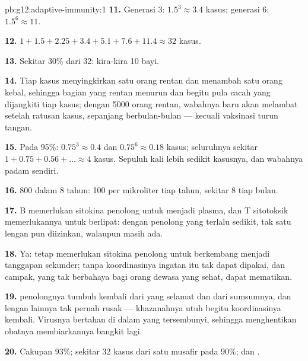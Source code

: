 \begin{solution}{pb:g12:adaptive-immunity:1}
\textbf{11.} Generasi 3: $1.5^3 \approx 3.4$ kasus; generasi 6:
$1.5^6 \approx 11$.

\textbf{12.} $1 + 1.5 + 2.25 + 3.4 + 5.1 + 7.6 + 11.4 \approx 32$ kasus.

\textbf{13.} Sekitar 30\% dari 32: kira-kira 10 bayi.

\textbf{14.} Tiap kasus menyingkirkan satu orang rentan dan menambah
satu orang kebal, sehingga bagian yang rentan menurun dan begitu pula
cacah yang dijangkiti tiap kasus; dengan 5000 orang rentan, wabahnya
baru akan melambat setelah ratusan kasus, sepanjang berbulan-bulan ---
kecuali vaksinasi turun tangan.

\textbf{15.} Pada 95\%: $0.75^3 \approx 0.4$ dan $0.75^6 \approx 0.18$
kasus; seluruhnya sekitar $1 + 0.75 + 0.56 + \dots \approx 4$ kasus.
Sepuluh kali lebih sedikit kasusnya, dan wabahnya padam sendiri.

\textbf{16.} 800 dalam 8 tahun: 100 per mikroliter tiap tahun, sekitar
8 tiap bulan.

\textbf{17.}  B memerlukan sitokina  penolong untuk menjadi 
plasma, dan  T sitotoksik memerlukannya untuk berlipat: dengan 
penolong yang terlalu sedikit, tak satu lengan pun diizinkan, walaupun
 masih ada.

\textbf{18.} Ya:  tetap memerlukan sitokina penolong untuk
berkembang menjadi tanggapan sekunder; tanpa koordinasinya ingatan itu
tak dapat dipakai, dan campak, yang tak berbahaya bagi orang dewasa
yang sehat, dapat mematikan.

\textbf{19.}   penolongnya tumbuh kembali dari  yang
selamat dan dari sumsumnya, dan  lengan lainnya tak pernah
rusak --- khazanahnya utuh begitu koordinasinya kembali. Virusnya
bertahan di dalam  yang tersembunyi, sehingga menghentikan obatnya
membiarkannya bangkit lagi.

\textbf{20.} Cakupan 93\%; sekitar 32 kasus dari satu musafir pada
90\%; dan .
\end{solution}
